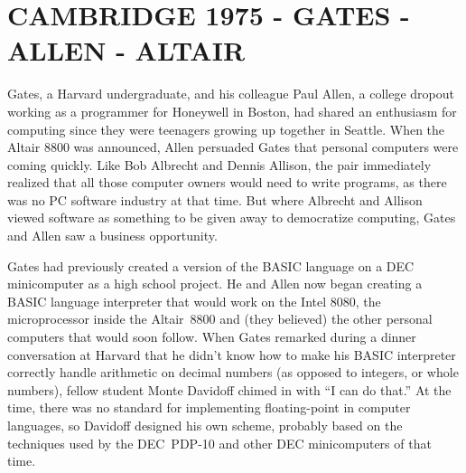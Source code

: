 
\section{CAMBRIDGE 1975 - GATES - ALLEN - ALTAIR}



Gates, a Harvard undergraduate, and his colleague Paul Allen, a
college dropout working as a programmer for Honeywell in Boston, had
shared an enthusiasm for computing since they were teenagers growing
up together in Seattle.
When the Altair 8800 was announced, Allen persuaded Gates that
personal computers were coming quickly.
Like Bob Albrecht and Dennis Allison, the pair immediately realized
that all those computer owners would need to write programs, as there
was no PC software industry at that time.
But where Albrecht and Allison viewed software as something to be
given away to democratize computing, Gates and Allen saw a business
opportunity.

Gates had previously created a version of the BASIC language on a DEC 
minicomputer as a high school project.
He and Allen now began creating a BASIC language interpreter that
would work on the Intel 8080, the microprocessor inside the
Altair~8800 and (they believed) the other personal computers
that would soon follow.
When Gates remarked during a dinner conversation at Harvard that he
didn't know how to make his BASIC interpreter correctly handle
arithmetic on decimal numbers (as opposed to integers, or whole numbers),
fellow student Monte
Davidoff chimed in with ``I can do that.''
At the time, there was no standard for implementing floating-point in
computer languages, so Davidoff designed his own scheme, probably
based on the techniques used by the DEC~PDP-10 and other DEC
minicomputers of that time.



